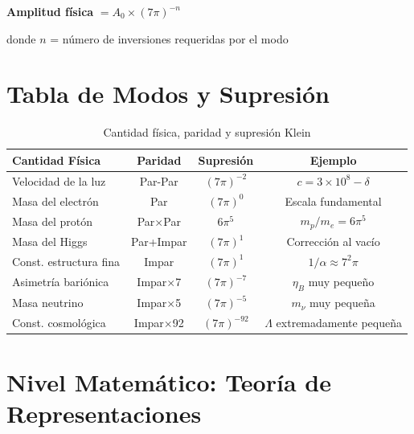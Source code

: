 \begin{tcolorbox}[colback=kleingray, colframe=kleinblue, title=\textbf{Regla de Selección de Klein}]
\begin{center}
\textbf{Amplitud física} $= A_0 \times (7\pi)^{-n}$

donde $n$ = número de inversiones requeridas por el modo
\end{center}
\end{tcolorbox}


\section{Tabla de Modos y Supresión}

\begin{table}[H]
\centering
\small
\caption{Cantidad física, paridad y supresión Klein}
\begin{tabular}{lccc}
\toprule
\textbf{Cantidad Física} & \textbf{Paridad} & \textbf{Supresión} & \textbf{Ejemplo} \\
\midrule
Velocidad de la luz & Par-Par & $(7\pi)^{-2}$ & $c = 3 \times 10^8 - \delta$ \\
Masa del electrón & Par & $(7\pi)^0$ & Escala fundamental \\
Masa del protón & Par$\times$Par & $6\pi^5$ & $m_p/m_e = 6\pi^5$ \\
Masa del Higgs & Par+Impar & $(7\pi)^1$ & Corrección al vacío \\
Const. estructura fina & Impar & $(7\pi)^1$ & $1/\alpha \approx 7^2\pi$ \\
Asimetría bariónica & Impar$\times$7 & $(7\pi)^{-7}$ & $\eta_B$ muy pequeño \\
Masa neutrino & Impar$\times$5 & $(7\pi)^{-5}$ & $m_\nu$ muy pequeña \\
Const. cosmológica & Impar$\times$92 & $(7\pi)^{-92}$ & $\Lambda$ extremadamente pequeña \\
\bottomrule
\end{tabular}
\end{table}


\section{Nivel Matemático: Teoría de Representaciones}


